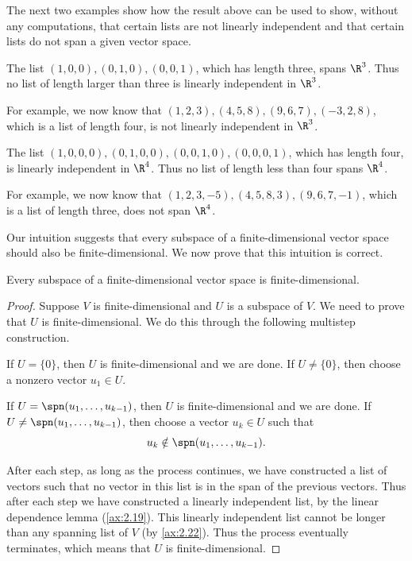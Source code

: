 The next two examples show how the result above can be used to show, without
any computations, that certain lists are not linearly independent and that
certain lists do not span a given vector space.

\begin{example}\label{ax:2.23}
The list $(1,0,0),(0,1,0),(0,0,1)$, which has length three, spans $\R^3$. Thus
no list of length larger than three is linearly independent in $\R^3$.

For example, we now know that $(1,2,3),(4,5,8),(9,6,7),(-3,2,8)$, which is a
list of length four, is not linearly independent in $\R^3$.
\end{example}

\begin{example}\label{ax:2.24}
The list $(1,0,0,0),(0,1,0,0),(0,0,1,0),(0,0,0,1)$, which has length four, is
linearly independent in $\R^4$. Thus no list of length less than four spans
$\R^4$.

For example, we now know that $(1,2,3,-5),(4,5,8,3),(9,6,7,-1)$, which is a
list of length three, does not span $\R^4$.
\end{example}

Our intuition suggests that every subspace of a finite-dimensional vector space
should also be finite-dimensional. We now prove that this intuition is
correct.

\begin{result}\label{ax:2.25}
Every subspace of a finite-dimensional vector space is finite-dimensional.
\end{result}

\begin{proof}
Suppose $V$ is finite-dimensional and $U$ is a subspace of $V$. We need to
prove that $U$ is finite-dimensional. We do this through the following
multistep construction.
\begin{description}[style=nextline,leftmargin=1em,itemsep=2pt,parsep=3pt]
\item[Step 1] If $U=\{0\}$, then $U$ is finite-dimensional and we are done. If
  $U\ne\{0\}$, then choose a nonzero vector $u_1\in U$.
\item[Step $\bm{k}$] If $U=\spn(u_1,\dots,u_{k-1})$, then $U$ is
  finite-dimensional and we are done. If $U\ne\spn(u_1,\dots,u_{k-1})$, then
  choose a vector $u_k\in U$ such that
  \[ u_k\notin\spn(u_1,\dots,u_{k-1}). \]
\end{description}

After each step, as long as the process continues, we have constructed a list
of vectors such that no vector in this list is in the span of the previous
vectors. Thus after each step we have constructed a linearly independent list,
by the linear dependence lemma (\ref{ax:2.19}). This linearly independent list
cannot be longer than any spanning list of $V$ (by \ref{ax:2.22}). Thus the
process eventually terminates, which means that $U$ is finite-dimensional.
\end{proof}

